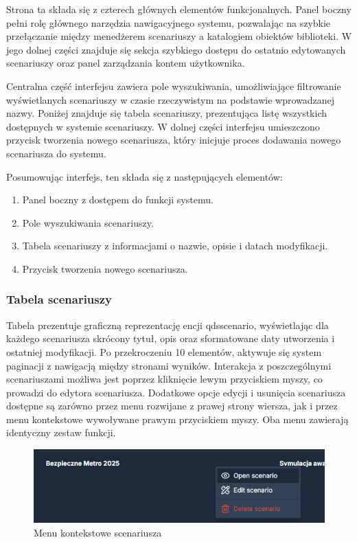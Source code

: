 Strona ta składa się z czterech głównych elementów funkcjonalnych. 
Panel boczny pełni rolę głównego narzędzia nawigacyjnego systemu, pozwalając na szybkie przełączanie między menedżerem scenariuszy a katalogiem obiektów biblioteki. W jego dolnej części znajduje się sekcja szybkiego dostępu do ostatnio edytowanych scenariuszy oraz panel zarządzania kontem użytkownika.


Centralna część interfejsu zawiera pole wyszukiwania, umożliwiające filtrowanie wyświetlanych scenariuszy w czasie rzeczywistym na podstawie wprowadzanej nazwy. Poniżej znajduje się tabela scenariuszy, prezentująca listę wszystkich dostępnych w systemie scenariuszy.
W dolnej części interfejsu umieszczono przycisk tworzenia nowego scenariusza, który inicjuje proces dodawania nowego scenariusza do systemu.

Posumowując interfejs, ten składa się z następujących elementów:
\begin{enumerate}
    \item Panel boczny z dostępem do funkcji systemu.
    \item Pole wyszukiwania scenariuszy.
    \item Tabela scenariuszy z informacjami o nazwie, opisie i datach modyfikacji.
    \item Przycisk tworzenia nowego scenariusza.
\end{enumerate}

\subsubsection{Tabela scenariuszy}
Tabela prezentuje graficzną reprezentację encji qds\textunderscore scenario, wyświetlając dla każdego scenariusza skrócony tytuł, opis oraz sformatowane daty utworzenia i ostatniej modyfikacji. Po przekroczeniu 10 elementów, aktywuje się system paginacji z nawigacją między stronami wyników.
Interakcja z poszczególnymi scenariuszami możliwa jest poprzez kliknięcie lewym przyciskiem myszy, co prowadzi do edytora scenariusza. Dodatkowe opcje edycji i usunięcia scenariusza dostępne są zarówno przez menu rozwijane z prawej strony wiersza, jak i przez menu kontekstowe wywoływane prawym przyciskiem myszy. Oba menu zawierają identyczny zestaw funkcji.
\begin{figure}[h]
    \centering
    \includegraphics[width=\textwidth]{resources/local/04-implementacja/frontend/landing/context-menu}
    \caption{Menu kontekstowe scenariusza}
\end{figure}

